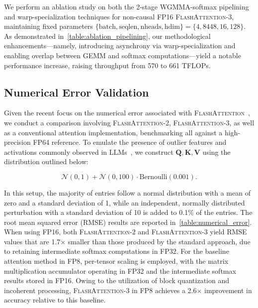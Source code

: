 \begin{enumerate}
\begin{itemize}
We perform an ablation study on both the 2-stage WGMMA-softmax pipelining and warp-specialization techniques for non-causal FP16 \textsc{FlashAttention-3}, maintaining fixed parameters $\{\text{batch}, \text{seqlen}, \text{nheads}, \text{hdim}\} = \{ 4, 8448, 16, 128\}$. As demonstrated in~\cref{table:ablation_pipelining}, our methodological enhancements—namely, introducing asynchrony via warp-specialization and enabling overlap between GEMM and softmax computations—yield a notable performance increase, raising throughput from 570 to 661 TFLOPs.

\subsection{Numerical Error Validation}
\label{sec:numerical_error}

Given the recent focus on the numerical error associated with \textsc{FlashAttention}~\citep{golden2024flash}, we conduct a comparison involving \textsc{FlashAttention-2}, \textsc{FlashAttention-3}, as well as a conventional attention implementation, benchmarking all against a high-precision FP64 reference. To emulate the presence of outlier features and activations commonly observed in LLMs~\citep{dettmers2208llm, sun2024massive}, we construct $\mathbf{Q}, \mathbf{K}, \mathbf{V}$ using the distribution outlined below:

\begin{equation*}
  \mathcal{N}(0, 1) + \mathcal{N}(0, 100) \cdot \mathrm{Bernoulli}(0.001).
\end{equation*}

In this setup, the majority of entries follow a normal distribution with a mean of zero and a standard deviation of 1, while an independent, normally distributed perturbation with a standard deviation of 10 is added to 0.1\% of the entries. The root mean squared error (RMSE) results are reported in~\cref{table:numerical_error}. When using FP16, both \textsc{FlashAttention-2} and \textsc{FlashAttention-3} yield RMSE values that are 1.7$\times$ smaller than those produced by the standard approach, due to retaining intermediate softmax computations in FP32. For the baseline attention method in FP8, per-tensor scaling is employed, with the matrix multiplication accumulator operating in FP32 and the intermediate softmax results stored in FP16. Owing to the utilization of block quantization and incoherent processing, \textsc{FlashAttention-3} in FP8 achieves a 2.6$\times$ improvement in accuracy relative to this baseline.


\end{itemize}
\end{enumerate}
